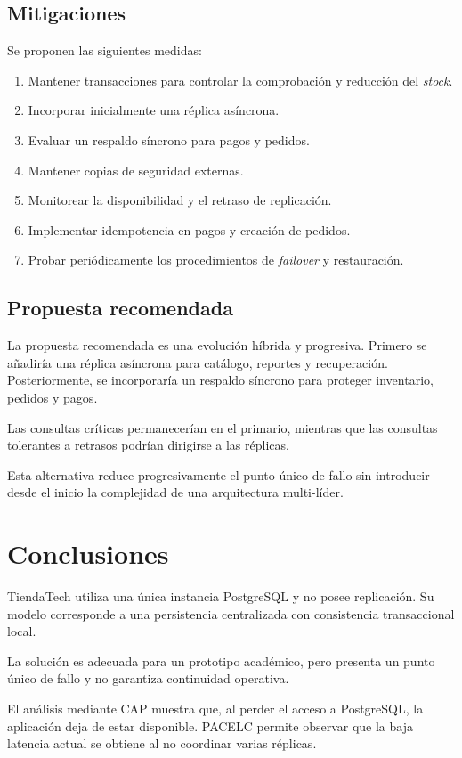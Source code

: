 \documentclass[11pt,a4paper]{article}
\begin{document}
\subsection{Mitigaciones}
Se proponen las siguientes medidas:

\begin{enumerate}
    \item Mantener transacciones para controlar la comprobación y reducción del \textit{stock}.
    \item Incorporar inicialmente una réplica asíncrona.
    \item Evaluar un respaldo síncrono para pagos y pedidos.
    \item Mantener copias de seguridad externas.
    \item Monitorear la disponibilidad y el retraso de replicación.
    \item Implementar idempotencia en pagos y creación de pedidos.
    \item Probar periódicamente los procedimientos de \textit{failover} y restauración.
\end{enumerate}

\subsection{Propuesta recomendada}
La propuesta recomendada es una evolución híbrida y progresiva. Primero se añadiría una réplica asíncrona para catálogo, reportes y recuperación. Posteriormente, se incorporaría un respaldo síncrono para proteger inventario, pedidos y pagos.

Las consultas críticas permanecerían en el primario, mientras que las consultas tolerantes a retrasos podrían dirigirse a las réplicas.

Esta alternativa reduce progresivamente el punto único de fallo sin introducir desde el inicio la complejidad de una arquitectura multi-líder.

\section{Conclusiones}
TiendaTech utiliza una única instancia PostgreSQL y no posee replicación. Su modelo corresponde a una persistencia centralizada con consistencia transaccional local.

La solución es adecuada para un prototipo académico, pero presenta un punto único de fallo y no garantiza continuidad operativa.

El análisis mediante CAP muestra que, al perder el acceso a PostgreSQL, la aplicación deja de estar disponible. PACELC permite observar que la baja latencia actual se obtiene al no coordinar varias réplicas.
\end{document}
